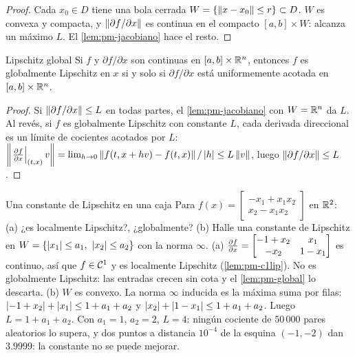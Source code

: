 \begin{proof}
Cada $x_0\in D$ tiene una bola cerrada $W=\{\left\lVert x-x_0\right\rVert\le r\}\subset D$. $W$ es convexa y compacta, y $\left\lVert \partial f/\partial x\right\rVert$ es continua en el compacto $[a,b]\times W$: alcanza un máximo $L$. El \cref{lem:pm-jacobiano} hace el resto.
\end{proof}

\begin{lema}[label=lem:pm-global]{Lipschitz global \citep[Lema~3.3]{Kha02}}
Si $f$ y $\partial f/\partial x$ son continuas en $[a,b]\times\mathbb{R}^n$, entonces $f$ es globalmente Lipschitz en $x$ si y solo si $\partial f/\partial x$ está uniformemente acotada en $[a,b]\times\mathbb{R}^n$.
\end{lema}

\begin{proof}
Si $\left\lVert \partial f/\partial x\right\rVert\le L$ en todas partes, el \cref{lem:pm-jacobiano} con $W=\mathbb{R}^n$ da $L$. Al revés, si $f$ es globalmente Lipschitz con constante $L$, cada derivada direccional es un límite de cocientes acotados por $L$: $\left\lVert \left.\frac{\partial f}{\partial x}\right|_{(t,x)}v\right\rVert=\lim_{h\to0}\left\lVert f(t,x+hv)-f(t,x)\right\rVert/\left\lvert h\right\rvert\le L\left\lVert v\right\rVert$, luego $\left\lVert \partial f/\partial x\right\rVert\le L$.
\end{proof}

\begin{ejemplo}[label=ej:pm-lipcaja]{Una constante de Lipschitz en una caja}
Para $f(x)=\begin{bmatrix}-x_1+x_1x_2\\ x_2-x_1x_2\end{bmatrix}$ en $\mathbb{R}^2$: (a) ¿es localmente Lipschitz?, ¿globalmente? (b) Halle una constante de Lipschitz en $W=\{\left\lvert x_1\right\rvert\le a_1,\ \left\lvert x_2\right\rvert\le a_2\}$ con la norma $\infty$.
\solucion (a) $\frac{\partial f}{\partial x}=\begin{bmatrix}-1+x_2&x_1\\-x_2&1-x_1\end{bmatrix}$ es continuo, así que $f\in\mathcal{C}^{1}$ y es localmente Lipschitz (\cref{lem:pm-c1lip}). No es globalmente Lipschitz: las entradas crecen sin cota y el \cref{lem:pm-global} lo descarta. (b) $W$ es convexo. La norma $\infty$ inducida es la máxima suma por filas: $\left\lvert -1+x_2\right\rvert+\left\lvert x_1\right\rvert\le1+a_1+a_2$ y $\left\lvert x_2\right\rvert+\left\lvert 1-x_1\right\rvert\le1+a_1+a_2$. Luego $L=1+a_1+a_2$. Con $a_1=1$, $a_2=2$, $L=4$: ningún cociente de $50\,000$ pares aleatorios lo supera, y dos puntos a distancia $10^{-4}$ de la esquina $(-1,-2)$ dan $3.9999$: la constante no se puede mejorar.
\end{ejemplo}

